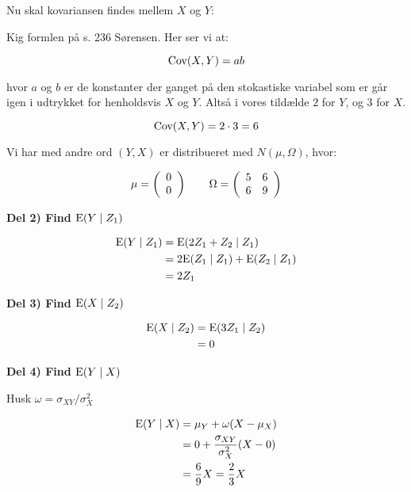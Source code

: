 Nu skal kovariansen findes mellem $X$ og $Y$:

Kig formlen på s. 236 Sørensen. Her ser vi at:

\begin{equation}
    \text{Cov}(X, Y) = ab
\end{equation}

hvor $a$ og $b$ er de konstanter der ganget på den stokastiske variabel som er går igen i udtrykket for henholdsvis $X$ og $Y$. Altså i vores tildælde $2$ for $Y$, og $3$ for $X$.

\begin{equation}
    \text{Cov}(X,Y) = 2 \cdot 3 = 6
\end{equation}

Vi har med andre ord $(Y,X)$ er distribueret med $N(\mu, \Omega)$, hvor:

\begin{equation}
    \mu = \left(
    \begin{array}{cc}
         0\\
         0 
    \end{array}
    \right) \qquad
    \Omega = \left(
    \begin{array}{cc}
        5 & 6 \\
        6 & 9
    \end{array} \right)
\end{equation}

\textbf{Del 2) Find $\text{E}(Y \mid Z_1)$}


\begin{align}
    \text{E}(Y \mid Z_1) &= \text{E}(2Z_1 +Z_2 \mid Z_1) \\
    &= 2\text{E}(Z_1 \mid Z_1) + \text{E}(Z_2\mid Z_1) \\
    &= 2Z_1
\end{align}

\textbf{Del 3) Find $\text{E}(X \mid Z_2)$}

\begin{align}
    \text{E}(X \mid Z_2) &= \text{E}(3Z_1 \mid Z_2) \\
    &= 0
\end{align}

\textbf{Del 4) Find $\text{E}(Y \mid X)$}

Husk $\omega = \sigma_{XY} / \sigma_X^2$

\begin{align}
    \text{E}(Y \mid X) &= \mu_Y + \omega(X - \mu_X) \\
    &= 0 + \frac{\sigma_{XY}}{\sigma_{X}^2}(X - 0) \\
    &= \frac{6}{9}X = \frac{2}{3}X
\end{align}


